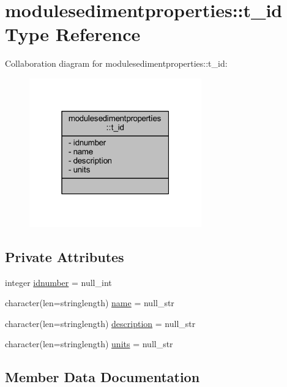 \hypertarget{structmodulesedimentproperties_1_1t__id}{}\section{modulesedimentproperties\+:\+:t\+\_\+id Type Reference}
\label{structmodulesedimentproperties_1_1t__id}


Collaboration diagram for modulesedimentproperties\+:\+:t\+\_\+id\+:\nopagebreak
\begin{figure}[H]
\begin{center}
\leavevmode
\includegraphics[width=211pt]{structmodulesedimentproperties_1_1t__id__coll__graph}
\end{center}
\end{figure}
\subsection*{Private Attributes}
\begin{DoxyCompactItemize}
\item 
integer \mbox{\hyperlink{structmodulesedimentproperties_1_1t__id_a87837ed3476fb5890bfc87f306607948}{idnumber}} = null\+\_\+int
\item 
character(len=stringlength) \mbox{\hyperlink{structmodulesedimentproperties_1_1t__id_ac83333cae4b48e23b249da0e9ec62019}{name}} = null\+\_\+str
\item 
character(len=stringlength) \mbox{\hyperlink{structmodulesedimentproperties_1_1t__id_aa94406bb2e4603c25ed6a852fad7d443}{description}} = null\+\_\+str
\item 
character(len=stringlength) \mbox{\hyperlink{structmodulesedimentproperties_1_1t__id_aa0d548eb3847819c9a6e410e4209cef8}{units}} = null\+\_\+str
\end{DoxyCompactItemize}


\subsection{Member Data Documentation}
\mbox{\label{structmodulesedimentproperties_1_1t__id_aa94406bb2e4603c25ed6a852fad7d443}} 
